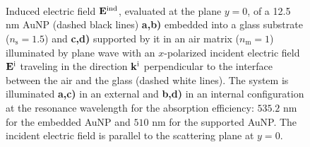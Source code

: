 \begin{figure}[t!]\centering
   \def\svgwidth{.85\textwidth}
   \small
   \\[-33.75em]
   \hspace*{-.35\textwidth}
       \begin{subfigure}{.35\textwidth}\textcolor{red}{\caption{ } \label{sfig:Near:EE}}\end{subfigure}%
       \begin{subfigure}{.34\textwidth}\caption{ }\label{sfig:Near:EI}\end{subfigure}\\[13.75em]
   \hspace*{-.34\textwidth}
       \begin{subfigure}{.35\textwidth}\caption{ } \label{sfig:Near:SE}\end{subfigure}%
       \begin{subfigure}{.34\textwidth}\caption{ }\label{sfig:Near:SI}\end{subfigure}\\[16em]
   \caption[Induced Electric Field of a 12.5 nm Au Spherical NP embbeded into (supported by) a substrate illuminated at a normal incidence]{Induced electric field $\vb{E}^\text{ind}$, evaluated at the plane $y = 0$, of a 12.5 nm AuNP (dashed black lines) \textbf{a,b)} embedded into a glass substrate ($n_\text{s} = 1.5$) and \textbf{c,d)} supported by it in an air matrix ($n_\text{m} = 1$) illuminated by plane wave with an $x$-polarized incident electric field $\vb{E}^\text{i}$ traveling in the direction $\vb{k}^\text{i}$ perpendicular to the interface between the air and the glass (dashed white lines). The system is illuminated \textbf{a,c)}  in an external and \textbf{b,d)} in an internal configuration at the resonance  wavelength for the absorption efficiency: $535.2$ nm for the embedded AuNP and $510$ nm for the supported AuNP. The incident electric field is parallel to the scattering plane at $y=0$.
   }
   \label{fig:Near:IntExt}
 \end{figure}

